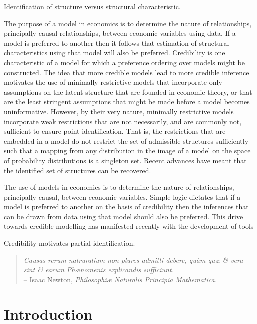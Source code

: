 \documentclass[10pt,a4paper,twoside]{article}
\newcommand{\details}{C:/Dropbox/TeXTemplates/}
\numberwithin{equation}{subsection}
\begin{document}
Identification of structure versus structural characteristic.

The purpose of a model in economics is to determine the nature of relationships, principally causal relationships, between economic variables using data. If a model is preferred to another then it follows that estimation of structural characteristics using that model will also be preferred. Credibility is one characteristic of a model for which a preference ordering over models might be constructed. The idea that more credible models lead to more credible inference motivates the use of minimally restrictive models that incorporate only assumptions on the latent structure that are founded in economic theory, or that are the least stringent assumptions that might be made before a model becomes uninformative. However, by their very nature, minimally restrictive models incorporate weak restrictions that are not necessarily, and are commonly not, sufficient to ensure point identification. That is, the restrictions that are embedded in a model do not restrict the set of admissible structures sufficiently such that a mapping from any distribution in the image of a model on the space of probability distributions is a singleton set. Recent advances have meant that the identified set of structures can be recovered.  

The use of models in economics is to determine the nature of relationships, principally causal, between economic variables. Simple logic dictates that if a model is preferred to another on the basis of credibility then the inferences that can be drawn from data using that model should also be preferred. This drive towards credible modelling has manifested recently with the development of tools 

Credibility motivates partial identification. 
\begin{quote}
\textit{Causas rerum natruralium non plures admitti debere, qu{\`{a}}m qu{\ae} \& vera sint \& earum Ph{\ae}nomenis explicandis sufficiunt.}\\ 
\vspace{10pt}
\--- Isaac Newton, \textit{Philosophi{\ae} Naturalis Principia Mathematica.}
\end{quote}

\section{Introduction}



\end{document}
